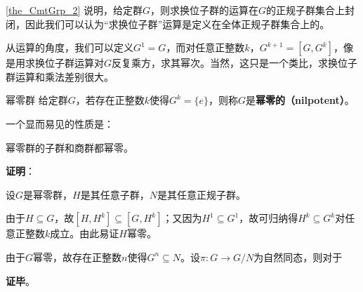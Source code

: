 




\autoref{the_CmtGrp_2} 说明，给定群$G$，则求换位子群的运算在$G$的正规子群集合上封闭，因此我们可以认为“求换位子群”运算是定义在全体正规子群集合上的。

从运算的角度，我们可以定义$G^1=G$，而对任意正整数$k$，$G^{k+1}=[G, G^{k}]$，像是用求换位子群运算对$G$反复乘方，求其幂次。当然，这只是一个类比，求换位子群运算和乘法差别很大。


\begin{definition}{幂零群}
给定群$G$，若存在正整数$k$使得$G^k=\{e\}$，则称$G$是\textbf{幂零的（nilpotent）}。
\end{definition}

一个显而易见的性质是：


\begin{theorem}{}
幂零群的子群和商群都幂零。
\end{theorem}

\textbf{证明}：

设$G$是幂零群，$H$是其任意子群，$N$是其任意正规子群。

由于$H\subseteq G$，故$[H, H^{k}]\subseteq [G, H^{k}]$；又因为$H^1\subseteq G^1$，故可归纳得$H^k\subseteq G^k$对任意正整数$k$成立。由此易证$H$幂零。

由于$G$幂零，故存在正整数$n$使得$G^n\subseteq N$。设$\pi:G\to G/N$为自然同态，则对于

\textbf{证毕}。



































